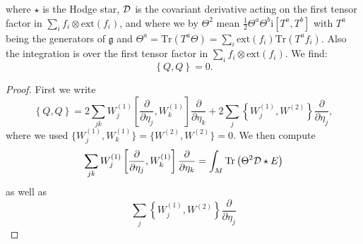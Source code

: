 \documentclass[letterpaper,12pt]{article}
\newcommand{\nn}{\nonumber}
\def\cd{{\cal D}}
\newcommand{\pa}{\partial}
\begin{document}
where $\star$ is the Hodge star, $\cd$ is the covariant derivative acting on the first tensor factor in $\displaystyle{\sum_i f_i\otimes \mbox{ext}(f_i)}$, and where we by $\Theta^2$
mean $\frac{1}{2}\Theta^a \Theta^b \mathrm{i}[T^a, T^b]$ with $T^a$ being the generators of $\mathfrak{g}$ and $\Theta^a= \mbox{Tr}(T^a \Theta)=\sum_i \mbox{ext}(f_i) \mbox{Tr}(T^a f_i)$. Also the integration is over the first tensor factor in  $\displaystyle{\sum_i f_i\otimes \mbox{ext}(f_i)}$. We find:
\begin{equation*}
\left\{ Q, Q \right\} =0.
\end{equation*}



\begin{proof}
First we write
\begin{equation*}
\left\{ Q, Q \right\} =
%
%
%
2\sum_{jk} W^{(1)}_j \left[ \frac{\pa}{\pa {\eta}_j}, W^{(1)}_k  \right]\frac{\pa}{\pa {\eta}_k}
+  2\sum_j \left\{ W^{(1)}_j, W^{(2)}  \right\}\frac{\pa}{\pa {\eta}_j} ,
\end{equation*}
where we used $\{W^{(1)}_j, W^{(1)}_k\}=\{W^{(2)},W^{(2)}\}
=0$. We then compute
\begin{equation*}
\sum_{jk} W^{(1)}_j \left[ \frac{\pa}{\pa {\eta}_j}, W^{(1)}_k  \right]\frac{\pa}{\pa {\eta}_k} 
= \int_M   \mbox{Tr}\left( \Theta^2 \cd\star {E} \right)
\end{equation*}
as well as
\begin{equation*}
\sum_j \left\{ W^{(1)}_j, W^{(2)}  \right\}\frac{\pa}{\pa {\eta}_j} 

\end{equation*}
\end{proof}
\end{document}

